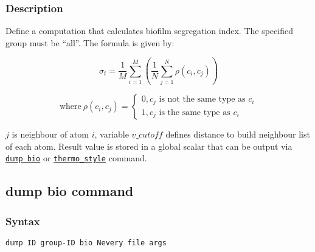 \documentclass[11pt,a4paper,openright]{article}
\begin{document}
\subsubsection*{Description}
Define a computation that calculates biofilm segregation index.
The specified group must be  ``all''.
The formula is given by:

\[ \sigma_t = \frac{1}{M} \sum_{i=1}^M (\frac{1}{N} \sum_{j=1}^{N} \rho(c_i, c_j)) \]

\[\text{where} \: \rho(c_i, c_j) = 
 \begin{cases}
  0, c_j \text{ is not the same type as } c_i\\
  1, c_j \text{ is the same type as } c_i
 \end{cases} 
\]

$j$ is neighbour of atom $i$, variable $v\_cutoff$ defines distance to build neighbour list of each atom.
Result value is stored in 
a global scalar that can be output via \hyperref[dumpbio]{\tt dump bio}
or \href{http://lammps.sandia.gov/doc/thermo_style.html}{\tt thermo\_style} command.

\newpage
\subsection{dump bio command}
\label{dumpbio}

\subsubsection*{Syntax}
\begin{Verbatim}[frame=single]
dump ID group-ID bio Nevery file args	
\end{Verbatim}
\end{document}
